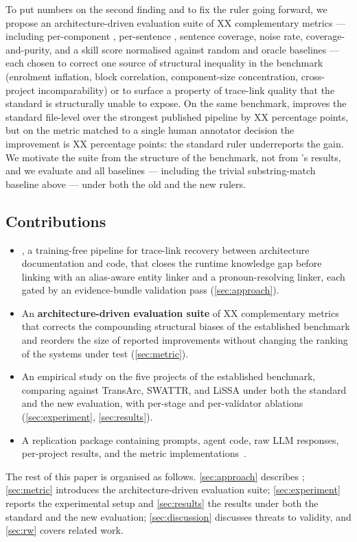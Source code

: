 To put numbers on the second finding and to fix the ruler going forward, we propose an architecture-driven evaluation suite of XX complementary metrics --- including per-component \fone, per-sentence \fone, sentence coverage, noise rate, coverage-and-purity, and a skill score normalised against random and oracle baselines --- each chosen to correct one source of structural inequality in the benchmark (enrolment inflation, block correlation, component-size concentration, cross-project incomparability) or to surface a property of trace-link quality that the standard \fone is structurally unable to expose.
On the same benchmark, \approach improves the standard file-level \fone over the strongest published pipeline by XX percentage points, but on the metric matched to a single human annotator decision the improvement is XX percentage points: the standard ruler underreports the gain.
We motivate the suite from the structure of the benchmark, not from \approach's results, and we evaluate \approach and all baselines --- including the trivial substring-match baseline above --- under both the old and the new rulers.

\subsection*{Contributions}
\begin{itemize}[leftmargin=*]
    \item \textbf{\approach}, a training-free pipeline for trace-link recovery between architecture documentation and code, that closes the runtime knowledge gap before linking with an alias-aware entity linker and a pronoun-resolving linker, each gated by an evidence-bundle validation pass (\autoref{sec:approach}).
    \item An \textbf{architecture-driven evaluation suite} of XX complementary metrics that corrects the compounding structural biases of the established benchmark and reorders the size of reported improvements without changing the ranking of the systems under test (\autoref{sec:metric}).
    \item An empirical study on the five projects of the established benchmark, comparing \approach against TransArc, SWATTR, and LiSSA under both the standard and the new evaluation, with per-stage and per-validator ablations (\autoref{sec:experiment}, \autoref{sec:results}).
    \item A replication package containing prompts, agent code, raw \ac{LLM} responses, per-project results, and the metric implementations~\cite{replication}.
\end{itemize}

The rest of this paper is organised as follows.
\autoref{sec:approach} describes \approach; \autoref{sec:metric} introduces the architecture-driven evaluation suite; \autoref{sec:experiment} reports the experimental setup and \autoref{sec:results} the results under both the standard and the new evaluation; \autoref{sec:discussion} discusses threats to validity, and \autoref{sec:rw} covers related work.
